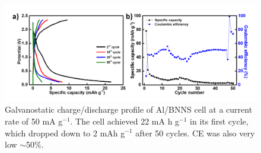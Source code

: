 \begin{figure}[tbh!]
\centering
\includegraphics[width=\textwidth]{Figures/BOhBN/BNNSCDCCE}
\caption{Galvanostatic charge/discharge profile of Al/BNNS cell at a current rate of 50 mA g$^{-1}$. The cell achieved 22 mA h g$^{-1}$ in its first cycle, which dropped down to 2 mAh g$^{-1}$ after 50 cycles. CE was also very low $\sim$50\%. }
\label{Figures/BOhBN:BNNSCDCCE}
\end{figure}

